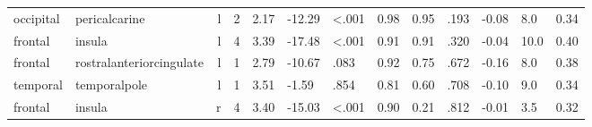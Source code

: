 \documentclass{article}
\begin{document}
\begin{longtable}{llrR{1.5cm}R{1cm}R{1.3cm}R{1cm}R{1cm}R{1.3cm}R{1cm}R{1.8cm}R{1.3cm}R{1.8cm}}
 occipital &             pericalcarine &    l &            2 &                  2.17 &           -12.29 &      \textless.001 &                               0.98 &                          0.95 &                            .193 & -0.08 &    8.0 &      0.34 \\
   frontal &                    insula &    l &            4 &                  3.39 &           -17.48 &      \textless.001 &                               0.91 &                          0.91 &                            .320 & -0.04 &   10.0 &      0.40 \\
   frontal &  rostralanteriorcingulate &    l &            1 &                  2.79 &           -10.67 &               .083 &                               0.92 &                          0.75 &                            .672 & -0.16 &    8.0 &      0.38 \\
  temporal &              temporalpole &    l &            1 &                  3.51 &            -1.59 &               .854 &                               0.81 &                          0.60 &                            .708 & -0.10 &    9.0 &      0.34 \\
   frontal &                    insula &    r &            4 &                  3.40 &           -15.03 &      \textless.001 &                               0.90 &                          0.21 &                            .812 & -0.01 &    3.5 &      0.32 \\
\end{longtable}
\end{document}
